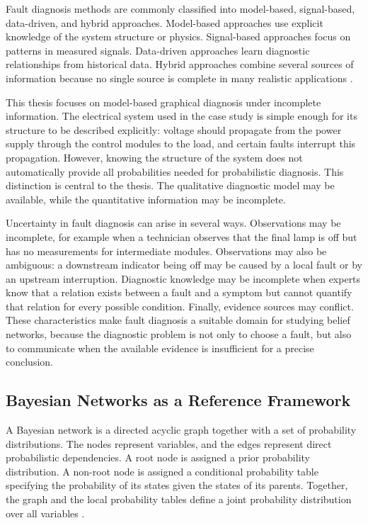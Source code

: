 \documentclass[runningheads]{llncs}
\begin{document}
Fault diagnosis methods are commonly classified into model-based, signal-based, data-driven, and hybrid approaches. Model-based approaches use explicit knowledge of the system structure or physics. Signal-based approaches focus on patterns in measured signals. Data-driven approaches learn diagnostic relationships from historical data. Hybrid approaches combine several sources of information because no single source is complete in many realistic applications \cite{Venkatasubramanian2003PartI,Venkatasubramanian2003PartII,Venkatasubramanian2003PartIII,GaoCecatiDing2015PartII}.

This thesis focuses on model-based graphical diagnosis under incomplete information. The electrical system used in the case study is simple enough for its structure to be described explicitly: voltage should propagate from the power supply through the control modules to the load, and certain faults interrupt this propagation. However, knowing the structure of the system does not automatically provide all probabilities needed for probabilistic diagnosis. This distinction is central to the thesis. The qualitative diagnostic model may be available, while the quantitative information may be incomplete.

Uncertainty in fault diagnosis can arise in several ways. Observations may be incomplete, for example when a technician observes that the final lamp is off but has no measurements for intermediate modules. Observations may also be ambiguous: a downstream indicator being off may be caused by a local fault or by an upstream interruption. Diagnostic knowledge may be incomplete when experts know that a relation exists between a fault and a symptom but cannot quantify that relation for every possible condition. Finally, evidence sources may conflict. These characteristics make fault diagnosis a suitable domain for studying belief networks, because the diagnostic problem is not only to choose a fault, but also to communicate when the available evidence is insufficient for a precise conclusion.

\subsection{Bayesian Networks as a Reference Framework}
\label{sec:bayesian_networks_reference}

A Bayesian network is a directed acyclic graph together with a set of probability distributions. The nodes represent variables, and the edges represent direct probabilistic dependencies. A root node is assigned a prior probability distribution. A non-root node is assigned a conditional probability table specifying the probability of its states given the states of its parents. Together, the graph and the local probability tables define a joint probability distribution over all variables \cite{Pearl1988,Heckerman1995}.
\end{document}
